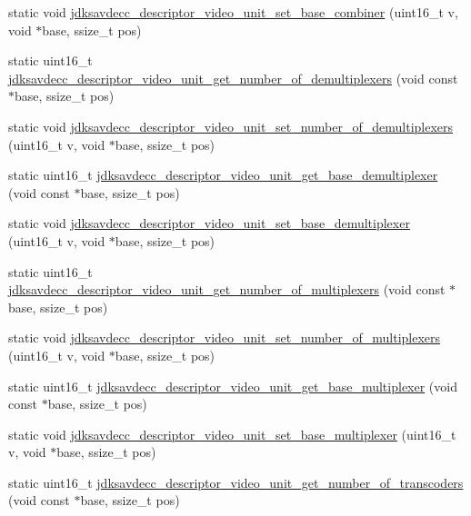 \begin{DoxyCompactItemize}
\item 
static void \hyperlink{group__descriptor__video_ga4dd99a1998a2c562421ee8c5ccf794f1}{jdksavdecc\+\_\+descriptor\+\_\+video\+\_\+unit\+\_\+set\+\_\+base\+\_\+combiner} (uint16\+\_\+t v, void $\ast$base, ssize\+\_\+t pos)
\item 
static uint16\+\_\+t \hyperlink{group__descriptor__video_gab485890893f1dc014a2e3333c6301b62}{jdksavdecc\+\_\+descriptor\+\_\+video\+\_\+unit\+\_\+get\+\_\+number\+\_\+of\+\_\+demultiplexers} (void const $\ast$base, ssize\+\_\+t pos)
\item 
static void \hyperlink{group__descriptor__video_ga28d4621e64f6fa0213b8e5be4db57510}{jdksavdecc\+\_\+descriptor\+\_\+video\+\_\+unit\+\_\+set\+\_\+number\+\_\+of\+\_\+demultiplexers} (uint16\+\_\+t v, void $\ast$base, ssize\+\_\+t pos)
\item 
static uint16\+\_\+t \hyperlink{group__descriptor__video_gaad93e05bd2731391e461d109a3de18a8}{jdksavdecc\+\_\+descriptor\+\_\+video\+\_\+unit\+\_\+get\+\_\+base\+\_\+demultiplexer} (void const $\ast$base, ssize\+\_\+t pos)
\item 
static void \hyperlink{group__descriptor__video_gacda33f0a85ac56466553789cb7180760}{jdksavdecc\+\_\+descriptor\+\_\+video\+\_\+unit\+\_\+set\+\_\+base\+\_\+demultiplexer} (uint16\+\_\+t v, void $\ast$base, ssize\+\_\+t pos)
\item 
static uint16\+\_\+t \hyperlink{group__descriptor__video_ga5f6354be05c405cb65a72e257593f634}{jdksavdecc\+\_\+descriptor\+\_\+video\+\_\+unit\+\_\+get\+\_\+number\+\_\+of\+\_\+multiplexers} (void const $\ast$base, ssize\+\_\+t pos)
\item 
static void \hyperlink{group__descriptor__video_ga977605b0f0b32e7295171790fe162347}{jdksavdecc\+\_\+descriptor\+\_\+video\+\_\+unit\+\_\+set\+\_\+number\+\_\+of\+\_\+multiplexers} (uint16\+\_\+t v, void $\ast$base, ssize\+\_\+t pos)
\item 
static uint16\+\_\+t \hyperlink{group__descriptor__video_ga51d7d10430142d5f93784fa4e8ccba7a}{jdksavdecc\+\_\+descriptor\+\_\+video\+\_\+unit\+\_\+get\+\_\+base\+\_\+multiplexer} (void const $\ast$base, ssize\+\_\+t pos)
\item 
static void \hyperlink{group__descriptor__video_ga6b5242166bd8f62aa1aeaa602ec6b7f5}{jdksavdecc\+\_\+descriptor\+\_\+video\+\_\+unit\+\_\+set\+\_\+base\+\_\+multiplexer} (uint16\+\_\+t v, void $\ast$base, ssize\+\_\+t pos)
\item 
static uint16\+\_\+t \hyperlink{group__descriptor__video_gadad0cd864c6ac1146610c6ffd1584791}{jdksavdecc\+\_\+descriptor\+\_\+video\+\_\+unit\+\_\+get\+\_\+number\+\_\+of\+\_\+transcoders} (void const $\ast$base, ssize\+\_\+t pos)

\end{DoxyCompactItemize}
